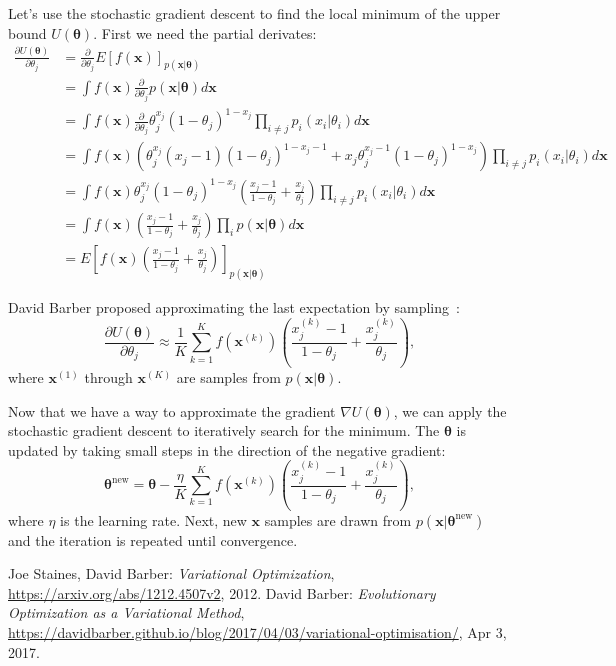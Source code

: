 \documentclass{article}
\renewcommand{\vec}[1]{\boldsymbol{#1}}
\begin{document}
Let's use the stochastic gradient descent to find the local minimum of
the upper bound $U(\vec{\theta})$. First we need the partial
derivates:
\begin{align*}
\frac{\partial U(\vec{\theta})}{\partial \theta_j}  &=
\frac{\partial}{\partial \theta_j} E
\left[f(\vec{x})\right]_{p(\vec{x} | \vec{\theta})}\\
&= \int f(\vec{x}) \frac{\partial}{\partial \theta_j} p(\vec{x} |
\vec{\theta})  d\vec{x}\\
&= \int f(\vec{x}) 
\frac{\partial}{\partial \theta_j} \theta_j^{x_j} (1-\theta_j)^{1 - x_j}
\prod_{i \neq j} p_i(x_i | \theta_i) d\vec{x}\\
&= \int f(\vec{x}) 
\left( \theta_j^{x_j} (x_j - 1) (1-\theta_j)^{1 - x_j - 1} + x_j
\theta_j^{x_j - 1} (1-\theta_j)^{1 - x_j} \right)
\prod_{i \neq j} p_i(x_i | \theta_i) d\vec{x}\\
&= \int f(\vec{x}) \theta_j^{x_j}
(1-\theta_j)^{1-x_j} \left( \frac{x_j - 1}{1 - \theta_j} +
\frac{x_j}{\theta_j} \right) \prod_{i \neq j} p_i(x_i | \theta_i) d\vec{x}\\
&= \int f(\vec{x}) \left( \frac{x_j - 1}{1 - \theta_j} +
\frac{x_j}{\theta_j} \right) \prod_i p(\vec{x} | \vec{\theta})
d\vec{x}\\
&= E\left[ f(\vec{x}) \left( \frac{x_j - 1}{1 - \theta_j} +
\frac{x_j}{\theta_j} \right) \right]_{p(\vec{x} | \vec{\theta})}
\end{align*}

David Barber proposed approximating the last expectation by sampling~\cite{barber2017}:
\[
\frac{\partial U(\vec{\theta})}{\partial \theta_j} \approx \frac{1}{K}
\sum_{k=1}^K f\left( \vec{x}^{(k)} \right) \left( \frac{x_j^{(k)} -
  1}{1 - \theta_j} + \frac{x_j^{(k)}}{\theta_j} \right),
\]
where $\vec{x}^{(1)}$ through $\vec{x}^{(K)}$ are samples from
$p(\vec{x}| \vec{\theta})$.

Now that we have a way to approximate the gradient $\nabla
U(\vec{\theta})$, we can apply the stochastic gradient descent to
iteratively search for the minimum. The $\vec{\theta}$ is updated by
taking small steps in the direction of the negative gradient:
\[
\vec{\theta}^{\text{new}} = \vec{\theta} - \frac{\eta}{K} \sum_{k=1}^K
f\left( \vec{x}^{(k)} \right) \left( \frac{x_j^{(k)} - 1}{1 -
  \theta_j} + \frac{x_j^{(k)}}{\theta_j} \right),
\]
where $\eta$ is the learning rate. Next, new $\vec{x}$ samples are drawn
from $p(\vec{x} | \vec{\theta}^{\text{new}})$ and the iteration is
repeated until convergence.

\begin{thebibliography}{9}
  Joe Staines, David Barber:
  \textit{Variational Optimization},
  \url{https://arxiv.org/abs/1212.4507v2}, 2012.
  David Barber:
  \textit{Evolutionary Optimization as a Variational Method},
  \url{https://davidbarber.github.io/blog/2017/04/03/variational-optimisation/},
  Apr 3, 2017.
\end{thebibliography}
\end{document}
